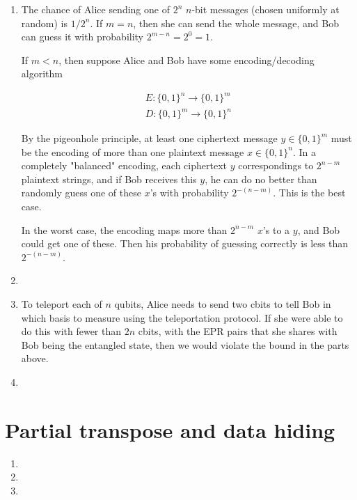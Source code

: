 \documentclass[12pt]{article}
\begin{document}
\begin{enumerate}

\item
The chance of Alice sending one of $2^n$ $n$-bit messages (chosen uniformly
at random) is $1/2^n$. If $m=n$, then she can send the whole message, and
Bob can guess it with probability $2^{m-n} = 2^0 = 1$.

If $m < n$, then suppose Alice and Bob have some encoding/decoding algorithm

\begin{multline}
E: \{0,1\}^n \rightarrow \{0,1\}^m \\
D: \{0,1\}^m \rightarrow \{0,1\}^n
\end{multline}

By the pigeonhole principle, at least one ciphertext message $y \in \{0,1\}^m$
must be the encoding of more than one plaintext message $x \in \{0,1\}^n$.
In a completely "balanced" encoding, each ciphertext $y$ correspondings to
$2^{n-m}$ plaintext strings, and if Bob receives this $y$, he can do no better
than randomly guess one of these $x$'s with probability $2^{-(n-m)}$. This is the
best case.

In the worst case, the encoding maps more than $2^{n-m}$ $x$'s to a $y$, and
Bob could get one of these. Then his probability of guessing correctly is
less than $2^{-(n-m)}$.

\item

\item

To teleport each of $n$ qubits, Alice needs to send two cbits to tell Bob
in which basis to measure using the teleportation protocol. If she were able
to do this with fewer than $2n$ cbits, with the EPR pairs that she shares with
Bob being the entangled state, then we would violate the bound in
the parts above.

\item 

\end{enumerate}

\pagebreak

\section{Partial transpose and data hiding}

\begin{enumerate}

\item

\item

\item

\end{enumerate}
\end{document}
